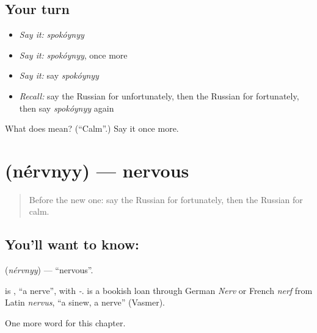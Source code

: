 \subsection*{Your turn}
\begin{itemize}
\raggedright
  \item \emph{Say it:} \emph{spokóynyy}
  \item \emph{Say it:} \emph{spokóynyy}, once more
  \item \emph{Say it:} say \emph{spokóynyy}
  \item \emph{Recall:} say the Russian for unfortunately, then the Russian for fortunately, then say \emph{spokóynyy} again
\end{itemize}

\begin{tcolorbox}[breakable,colback=teal!4,colframe=teal!35!black,title={Before you move on}]
What does  mean? (\textquotedblleft{}Calm\textquotedblright{}.) Say it once more.
\end{tcolorbox}
\section[\texorpdfstring{\ru{нервный} (nérvnyy)}{нервный (nérvnyy)}]{ (nérvnyy) — nervous}

\label{lesson:RU-C216-nervnyy}



\begin{quote}
Before the new one: say the Russian for fortunately, then the Russian for calm.
\end{quote}

\subsection*{You'll want to know: }
\textbf{} (\emph{nérvnyy}) — \textquotedblleft{}nervous\textquotedblright{}.

\begin{cousinweb}
\textbf{} is \emph{}, \textquotedblleft{}a nerve\textquotedblright{}, with \emph{-}. \emph{} is a bookish loan through German \emph{Nerv} or French \emph{nerf} from Latin \emph{nervus}, \textquotedblleft{}a sinew, a nerve\textquotedblright{} (Vasmer).
\end{cousinweb}

\begin{grammarlens}[title={What you've built}]
One more word for this chapter.
\end{grammarlens}

